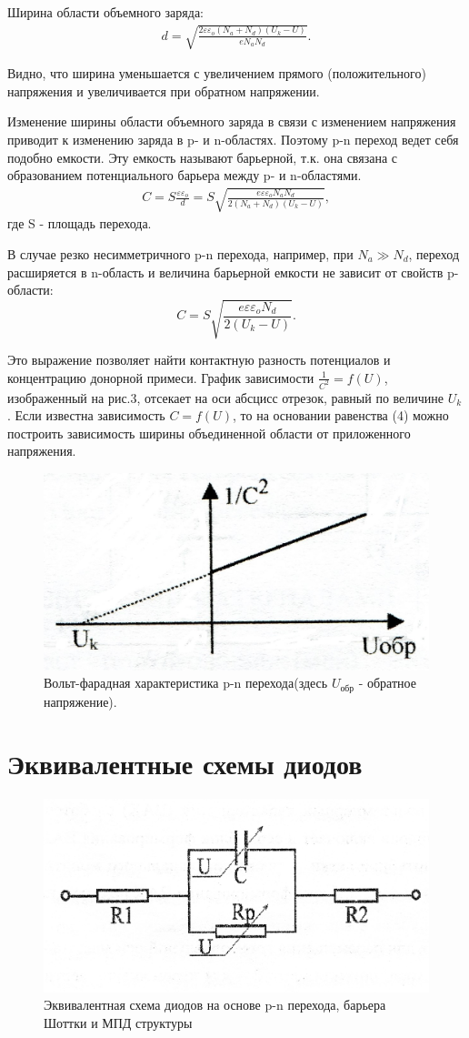 Ширина области объемного заряда:
\begin{gather}
	d=\sqrt{\frac{2\varepsilon \varepsilon_o(N_a+N_d)(U_k-U)}{eN_aN_d}}.
\end{gather} 

Видно, что ширина уменьшается с увеличением прямого (положительного) напряжения и увеличивается при обратном напряжении.

Изменение ширины области объемного заряда в связи с изменением напряжения приводит к изменению заряда в p- и n-областях. Поэтому p-n переход ведет себя подобно емкости. Эту емкость называют барьерной, т.к. она связана с образованием потенциального барьера между p- и n-областями. 
\begin{gather}
	C=S\frac{\varepsilon \varepsilon_o}{d}=S\sqrt{\frac{e\varepsilon \varepsilon_oN_aN_d}{2(N_a+N_d)(U_k-U)}},
\end{gather}
где S - площадь перехода.

В случае резко несимметричного p-n перехода, например, при $N_a \gg N_d$, переход расширяется в n-область и величина барьерной емкости не зависит от свойств p-области:
\begin{equation}
	C=S\sqrt{\frac{e\varepsilon \varepsilon_oN_d}{2(U_k-U)}}.
	\label{eq:2}
\end{equation}

Это выражение позволяет найти контактную разность потенциалов и концентрацию донорной примеси. График зависимости $\frac{1}{C^2}=f(U)$, изображенный на рис.3, отсекает на оси абсцисс отрезок, равный по величине $U_k$. Если известна зависимость $C=f(U)$, то на основании равенства (4) можно построить зависимость ширины объединенной области от приложенного напряжения.
\begin{figure}[h!]
	\centering
	\includegraphics[width=0.5\linewidth]{imgs/fig3.jpg}
	\caption{Вольт-фарадная характеристика p-n перехода(здесь $U_{\text{обр}}$ - обратное напряжение).}
	\label{fig:3}
\end{figure}

\section{Эквивалентные схемы диодов}
\begin{figure}[h!]
	\centering
	\includegraphics[width=0.5\linewidth]{imgs/fig4.jpg}
	\caption{Эквивалентная схема диодов на основе p-n перехода, барьера Шоттки и МПД структуры}
	\label{fig:4}
\end{figure}

